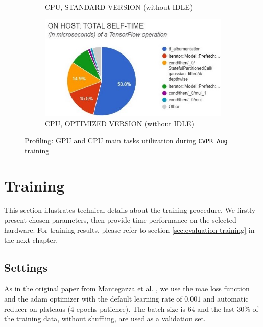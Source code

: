 \begin{figure}[!h]
\begin{center}
\begin{subfigure}[h]{0.49\textwidth}
			\caption[]{CPU, STANDARD VERSION (without IDLE)}
		\end{subfigure}
		\hfill
		\begin{subfigure}[h]{0.49\textwidth}
			\centering
			\includegraphics[width=1\textwidth]{"contents/images/05-profiling-CVPRaug-opt-cpu"}
			\caption[]{CPU, OPTIMIZED VERSION (without IDLE)}
		\end{subfigure}
	\end{center}
	\caption[Profiling: GPU and CPU main tasks utilization during \texttt{CVPR Aug} training]{Profiling: GPU and CPU main tasks utilization during \texttt{CVPR Aug} training}
	\label{fig:profiling-cvpraug-gpu}
\end{figure}






\section{Training}
\label{sec:implementation-training}

This section illustrates technical details about the training procedure. We firstly present chosen parameters, then provide time performance on the selected hardware. For training results, please refer to section \ref{sec:evaluation-training} in the next chapter.



\subsection{Settings}
\label{subsec:training-params}


As in the original paper from Mantegazza et al. \cite{mantegazza2019visionbased}, we use the \gls{mae} loss function and the \gls{adam} optimizer with the default learning rate of $0.001$ and automatic reducer on plateaus (4 epochs patience). The batch size is $64$ and the last 30\% of the training data, without shuffling, are used as a validation set.

